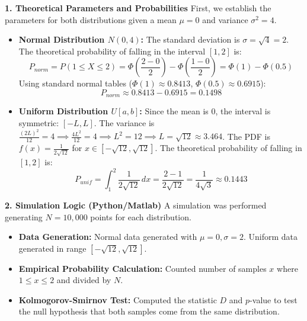 \documentclass{article}
\begin{document}
\textbf{1. Theoretical Parameters and Probabilities}
First, we establish the parameters for both distributions given a mean $\mu = 0$ and variance $\sigma^2 = 4$.

\begin{itemize}
	\item \textbf{Normal Distribution $N(0, 4)$:}
	      The standard deviation is $\sigma = \sqrt{4} = 2$.
	      The theoretical probability of falling in the interval $[1, 2]$ is:
	      \[ P_{norm} = P(1 \le X \le 2) = \Phi\left(\frac{2-0}{2}\right) - \Phi\left(\frac{1-0}{2}\right) = \Phi(1) - \Phi(0.5) \]
	      Using standard normal tables ($\Phi(1) \approx 0.8413$, $\Phi(0.5) \approx 0.6915$):
	      \[ P_{norm} \approx 0.8413 - 0.6915 = 0.1498 \]

	\item \textbf{Uniform Distribution $U[a, b]$:}
	      Since the mean is 0, the interval is symmetric: $[-L, L]$.
	      The variance is $\frac{(2L)^2}{12} = 4 \implies \frac{4L^2}{12} = 4 \implies L^2 = 12 \implies L = \sqrt{12} \approx 3.464$.
	      The PDF is $f(x) = \frac{1}{2\sqrt{12}}$ for $x \in [-\sqrt{12}, \sqrt{12}]$.
	      The theoretical probability of falling in $[1, 2]$ is:
	      \[ P_{unif} = \int_{1}^{2} \frac{1}{2\sqrt{12}} \, dx = \frac{2-1}{2\sqrt{12}} = \frac{1}{4\sqrt{3}} \approx 0.1443 \]
\end{itemize}

\textbf{2. Simulation Logic (Python/Matlab)}
A simulation was performed generating $N=10,000$ points for each distribution.
\begin{itemize}
	\item \textbf{Data Generation:}
	      Normal data generated with $\mu=0, \sigma=2$.
	      Uniform data generated in range $[-\sqrt{12}, \sqrt{12}]$.
	\item \textbf{Empirical Probability Calculation:}
	      Counted number of samples $x$ where $1 \le x \le 2$ and divided by $N$.
	\item \textbf{Kolmogorov-Smirnov Test:}
	      Computed the statistic $D$ and $p$-value to test the null hypothesis that both samples come from the same distribution.
\end{itemize}
\end{document}
